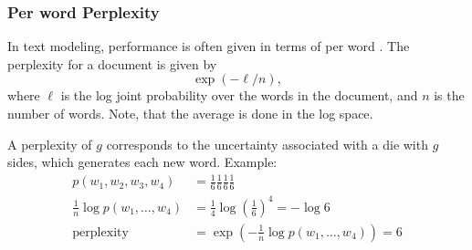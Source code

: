 \begin{frame}
\frametitle{Per word Perplexity}

In text modeling, performance is often given in terms of per word
. The perplexity for a document is given by
\[
\exp(-\ell/n),
\]
where $\ell$ is the  log joint probability over the words in the document,
and $n$ is the number of words. Note, that the average is done in the
log space.

A perplexity of $g$ corresponds to the uncertainty associated with a
die with $g$ sides, which generates each new word. Example:
\begin{align}
p(w_1,w_2,w_3,w_4) &= \frac{1}{6} \frac{1}{6}  \frac{1}{6}
\frac{1}{6}  \\
\frac{1}{n} \log p(w_1,\ldots, w_4)  &= \frac{1}{4} \log (\frac{1}{6})^4
= - \log 6 \\
\mathrm{perplexity} &= \exp ( - \frac{1}{n} \log p(w_1, \ldots, w_4)
) = 6 
\end{align}
\end{frame}


